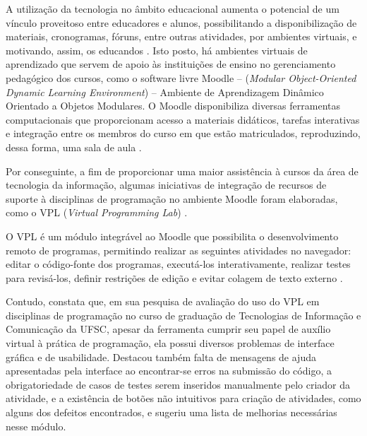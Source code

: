 




A utilização da tecnologia no âmbito educacional aumenta o potencial de um vínculo proveitoso entre educadores e alunos, possibilitando a disponibilização de materiais, cronogramas, fóruns, entre outras atividades, por ambientes virtuais, e motivando, assim, os educandos  \cite[p.~18-19]{franciscojuniorambrosio}. Isto posto, há ambientes virtuais de aprendizado que servem de apoio às instituições de ensino no gerenciamento pedagógico dos cursos, como o software livre Moodle – (\textit{Modular Object-Oriented Dynamic Learning Environment}) – Ambiente de Aprendizagem Dinâmico Orientado a Objetos Modulares. O Moodle disponibiliza diversas ferramentas computacionais que proporcionam acesso a materiais didáticos, tarefas interativas e integração entre os membros do curso em que estão matriculados, reproduzindo, dessa forma, uma sala de aula \cite{limamoodle}. 

Por conseguinte, a fim de proporcionar uma maior assistência à cursos da área de tecnologia da informação, algumas iniciativas de integração de recursos de suporte à disciplinas de programação no ambiente Moodle foram elaboradas, como o VPL (\textit{Virtual Programming Lab})  \cite[p.~712]{franca2011}. 

O VPL é um módulo integrável ao Moodle que possibilita o desenvolvimento remoto de programas, permitindo realizar as seguintes atividades no navegador: editar o código-fonte dos programas, executá-los interativamente, realizar testes para revisá-los, definir restrições de edição e evitar colagem de texto externo \cite{rodriguezdelpino}. 

Contudo, \textcite[p.~129]{freitas} constata que, em sua pesquisa de avaliação do uso do VPL em disciplinas de programação no curso de graduação de Tecnologias de Informação e Comunicação da UFSC, apesar da ferramenta cumprir seu papel de auxílio virtual à prática de programação, ela possui diversos problemas de interface gráfica e de usabilidade. Destacou também falta de mensagens de ajuda apresentadas pela interface ao encontrar-se erros na submissão do código, a obrigatoriedade de casos de testes serem inseridos manualmente pelo criador da atividade, e a existência de botões não intuitivos para criação de atividades, como alguns dos defeitos encontrados, e sugeriu uma lista de melhorias necessárias nesse módulo. 


